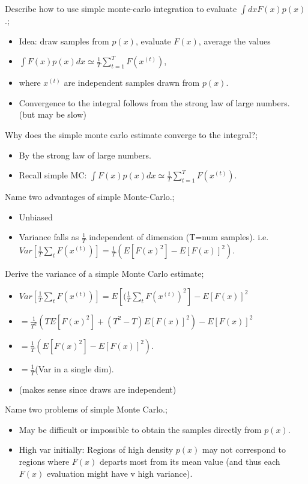 \documentclass{article}
\begin{document}
Describe how to use simple monte-carlo integration to evaluate $\int dx F(x) p(x)$.; \begin{itemize}
    \item Idea: draw samples from $p(x)$, evaluate $F(x)$, average the values
    \item $\int F(x)p(x)dx \simeq \frac{1}{T}\sum_{t=1}^T F(x^{(t)})$,
    \item where $x^({t})$ are independent samples drawn from $p(x)$.
    \item Convergence to the integral follows from the strong law of large numbers. (but may be slow)
\end{itemize}

Why does the simple monte carlo estimate converge to the integral?; \begin{itemize}
    \item By the strong law of large numbers.
    \item Recall simple MC: $\int F(x)p(x)dx \simeq \frac{1}{T}\sum_{t=1}^T F(x^{(t)})$.
\end{itemize} 

Name two advantages of simple Monte-Carlo.; \begin{itemize}
    \item Unbiased
    \item Variance falls as $\frac{1}{T}$ independent of dimension (T=num samples). i.e. $Var[\frac{1}{T}\sum_t F(x^{(t)})] = \frac{1}{T}(E[F(x)^2] - E[F(x)]^2)$.
\end{itemize}

Derive the variance of a simple Monte Carlo estimate; \begin{itemize}
    \item $Var[\frac{1}{T}\sum_t F(x^{(t)})] = E[(\frac{1}{T}\sum_t F(x^{(t)})^2] - E[F(x)]^2$
    \item $=\frac{1}{T^2}(TE[F(x)^2]+(T^2-T)E[F(x)]^2) - E[F(x)]^2$
    \item $= \frac{1}{T}(E[F(x)^2] - E[F(x)]^2)$.
    \item $=\frac{1}{T}$(Var in a single dim).
    \item (makes sense since draws are independent)
\end{itemize}

Name two problems of simple Monte Carlo.; \begin{itemize}
    \item May be difficult or impossible to obtain the samples directly from $p(x)$.
    \item High var initially: Regions of high density $p(x)$ may not correspond to regions where $F(x)$ departs most from its mean value (and thus each $F(x)$ evaluation might have v high variance).
\end{itemize}
\end{document}
